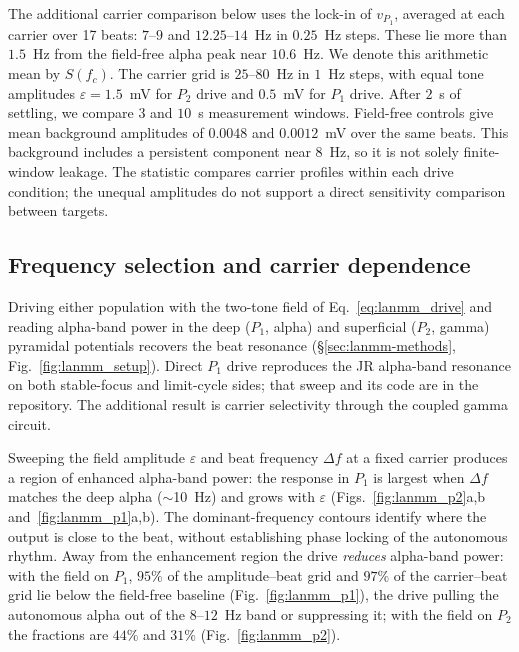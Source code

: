 \documentclass[11pt,a4paper]{article}
\providecommand{\DIFaddtex}[1]{{\protect\color{blue} \sf #1}} %
\providecommand{\DIFadd}[1]{\texorpdfstring{\DIFaddtex{#1}}{#1}} %
\begin{document}
\DIFadd{The additional carrier comparison below uses the lock-in
of $v_{P_1}$, averaged at each carrier over 17 beats: $7$--$9$ and
$12.25$--$14$~Hz in $0.25$~Hz steps. These lie more than $1.5$~Hz from the
field-free alpha peak near $10.6$~Hz. We denote this arithmetic mean by $S(f_c)$.
The carrier grid is $25$--$80$~Hz in $1$~Hz steps, with equal tone amplitudes
$\varepsilon=1.5$~mV for $P_2$ drive and $0.5$~mV for $P_1$ drive. After $2$~s
of settling, we compare $3$ and $10$~s measurement windows. Field-free controls
give mean background amplitudes of $0.0048$ and $0.0012$~mV over the same beats.
This background includes a persistent component near $8$~Hz, so it is not solely
finite-window leakage. The statistic compares carrier profiles within each drive
condition; the unequal amplitudes do not support a direct sensitivity comparison
between targets.
}

\subsection{\DIFadd{Frequency selection and carrier dependence}}\label{sec:lanmm-results}
\DIFadd{Driving either population with the two-tone field of Eq.~\eqref{eq:lanmm_drive}
and reading alpha-band power in the deep ($P_1$, alpha) and superficial ($P_2$,
gamma) pyramidal potentials recovers the beat resonance
(\S\ref{sec:lanmm-methods}, Fig.~\ref{fig:lanmm_setup}). Direct $P_1$ drive reproduces the JR
alpha-band resonance on both stable-focus and limit-cycle sides; that sweep
and its code are in the repository. The additional result is carrier selectivity
through the coupled gamma circuit.
}

\DIFadd{Sweeping the field amplitude $\varepsilon$ and beat frequency $\Delta f$ at a fixed
carrier produces a region of enhanced alpha-band power: the response in $P_1$ is largest
when $\Delta f$ matches the deep alpha ($\sim$10~Hz) and grows with $\varepsilon$
(Figs.~\ref{fig:lanmm_p2}a,b and~\ref{fig:lanmm_p1}a,b). The dominant-frequency
contours identify where the output is close to the beat, without establishing
phase locking of the autonomous rhythm. Away from the enhancement region the drive
\emph{reduces} alpha-band power: with the field on $P_1$, $95\%$ of the amplitude--beat
grid and $97\%$ of the carrier--beat grid lie below the field-free baseline
(Fig.~\ref{fig:lanmm_p1}), the drive pulling the autonomous alpha out of the $8$--$12$~Hz
band or suppressing it; with the field on $P_2$ the fractions are $44\%$ and $31\%$
(Fig.~\ref{fig:lanmm_p2}).
}
\end{document}
